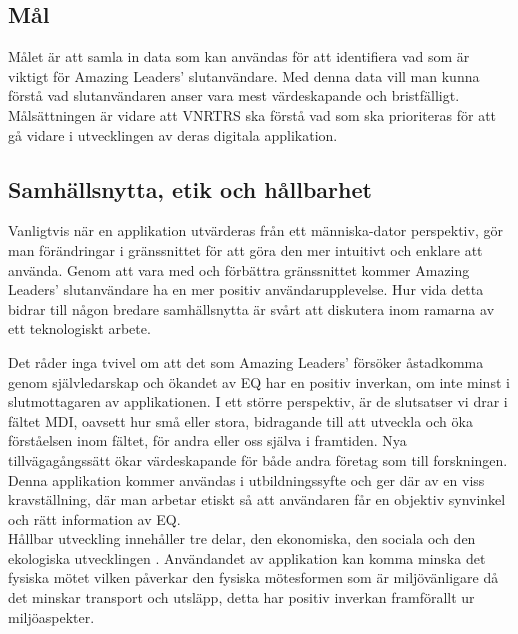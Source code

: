 \subsection{Mål}
Målet är att samla in data som kan användas för att identifiera vad som är viktigt för Amazing Leaders' slutanvändare. Med denna data vill man kunna förstå vad slutanvändaren anser vara mest värdeskapande och bristfälligt.
Målsättningen är vidare att VNRTRS ska förstå vad som ska prioriteras för att gå vidare i utvecklingen av deras digitala applikation.


\subsection{Samhällsnytta, etik och hållbarhet}
Vanligtvis när en applikation utvärderas från ett människa-dator perspektiv, gör man förändringar i gränssnittet för att göra den mer intuitivt och enklare att använda. Genom att vara med och förbättra gränssnittet kommer Amazing Leaders' slutanvändare ha en mer positiv användarupplevelse. Hur vida detta bidrar till någon bredare samhällsnytta är svårt att diskutera inom ramarna av ett teknologiskt arbete. 
\newline

Det råder inga tvivel om att det som Amazing Leaders' försöker åstadkomma genom självledarskap och ökandet av EQ har en positiv inverkan, om inte minst i slutmottagaren av applikationen. I ett större perspektiv, är de slutsatser vi drar i fältet MDI, oavsett hur små eller stora, bidragande till att utveckla och öka förståelsen inom fältet, för andra eller oss själva i framtiden. Nya tillvägagångssätt ökar värdeskapande för både andra företag som till forskningen. Denna applikation kommer användas i utbildningssyfte och ger där av en viss kravställning, där man arbetar etiskt så att användaren får en objektiv synvinkel och rätt information av EQ.
\\

Hållbar utveckling innehåller tre delar, den ekonomiska, den sociala och den ekologiska utvecklingen \cite{KTHHallbarKTH}. Användandet av applikation kan komma minska det fysiska mötet vilken påverkar den fysiska mötesformen som är miljövänligare då det minskar transport och utsläpp, detta har positiv inverkan framförallt ur miljöaspekter. 
\newline

